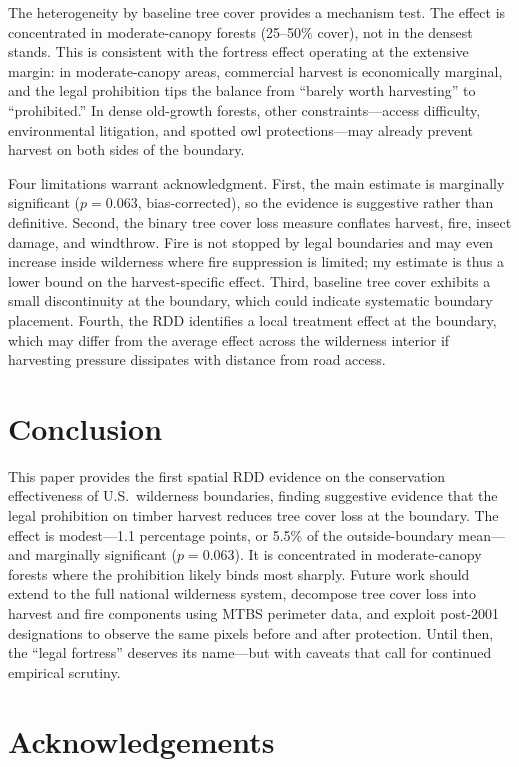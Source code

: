 \documentclass[12pt]{article}
\begin{document}
The heterogeneity by baseline tree cover provides a mechanism test. The effect is concentrated in moderate-canopy forests (25--50\% cover), not in the densest stands. This is consistent with the fortress effect operating at the extensive margin: in moderate-canopy areas, commercial harvest is economically marginal, and the legal prohibition tips the balance from ``barely worth harvesting'' to ``prohibited.'' In dense old-growth forests, other constraints---access difficulty, environmental litigation, and spotted owl protections---may already prevent harvest on both sides of the boundary.

Four limitations warrant acknowledgment. First, the main estimate is marginally significant ($p = 0.063$, bias-corrected), so the evidence is suggestive rather than definitive. Second, the binary tree cover loss measure conflates harvest, fire, insect damage, and windthrow. Fire is not stopped by legal boundaries and may even increase inside wilderness where fire suppression is limited; my estimate is thus a lower bound on the harvest-specific effect. Third, baseline tree cover exhibits a small discontinuity at the boundary, which could indicate systematic boundary placement. Fourth, the RDD identifies a local treatment effect at the boundary, which may differ from the average effect across the wilderness interior if harvesting pressure dissipates with distance from road access.


\section{Conclusion}

This paper provides the first spatial RDD evidence on the conservation effectiveness of U.S.\ wilderness boundaries, finding suggestive evidence that the legal prohibition on timber harvest reduces tree cover loss at the boundary. The effect is modest---1.1 percentage points, or 5.5\% of the outside-boundary mean---and marginally significant ($p = 0.063$). It is concentrated in moderate-canopy forests where the prohibition likely binds most sharply. Future work should extend to the full national wilderness system, decompose tree cover loss into harvest and fire components using MTBS perimeter data, and exploit post-2001 designations to observe the same pixels before and after protection. Until then, the ``legal fortress'' deserves its name---but with caveats that call for continued empirical scrutiny.

\section*{Acknowledgements}
\end{document}
